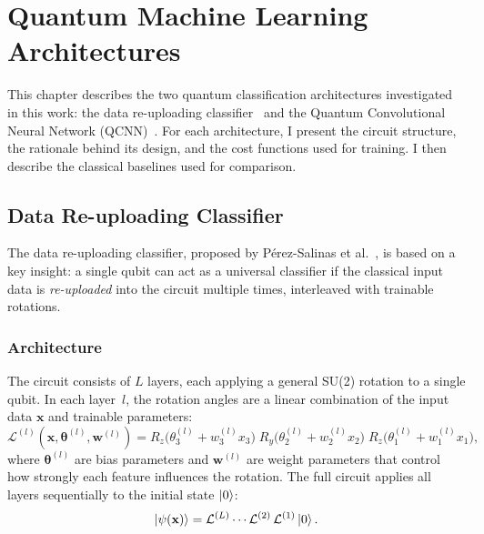 \chapter{Quantum Machine Learning Architectures}
\label{chap:architectures}

This chapter describes the two quantum classification architectures investigated in this work: the data re-uploading classifier~\cite{perez2020data} and the Quantum Convolutional Neural Network (QCNN)~\cite{hur2022quantum}. For each architecture, I present the circuit structure, the rationale behind its design, and the cost functions used for training. I then describe the classical baselines used for comparison.
\section{Data Re-uploading Classifier}
\label{sec:reuploading}

The data re-uploading classifier, proposed by P\'erez-Salinas et al.~\cite{perez2020data}, is based on a key insight: a single qubit can act as a universal classifier if the classical input data is \emph{re-uploaded} into the circuit multiple times, interleaved with trainable rotations.

\subsection{Architecture}

The circuit consists of $L$ layers, each applying a general SU(2) rotation to a single qubit. In each layer~$l$, the rotation angles are a linear combination of the input data $\mathbf{x}$ and trainable parameters:
\begin{equation}
    \mathcal{L}^{(l)}(\mathbf{x}, \boldsymbol{\theta}^{(l)}, \mathbf{w}^{(l)}) = R_z\!\big(\theta_3^{(l)} + w_3^{(l)} x_3\big)\; R_y\!\big(\theta_2^{(l)} + w_2^{(l)} x_2\big)\; R_z\!\big(\theta_1^{(l)} + w_1^{(l)} x_1\big),
    \label{eq:reup_layer}
\end{equation}
where $\boldsymbol{\theta}^{(l)}$ are bias parameters and $\mathbf{w}^{(l)}$ are weight parameters that control how strongly each feature influences the rotation. The full circuit applies all layers sequentially to the initial state $\ket{0}$:
\begin{equation}
    \ket{\psi(\mathbf{x})} = \mathcal{L}^{(L)} \cdots \mathcal{L}^{(2)}\, \mathcal{L}^{(1)} \ket{0}.
    \label{eq:reup_full}
\end{equation}


